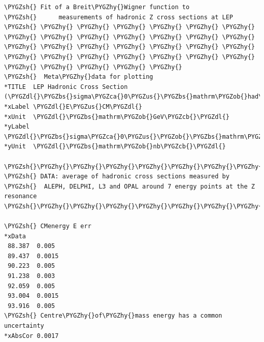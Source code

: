 \documentclass[a4paper,10pt,english]{sphinxmanual}
\def\PYGZbs{\char`\\}
\def\PYGZus{\char`\_}
\def\PYGZob{\char`\{}
\def\PYGZcb{\char`\}}
\def\PYGZca{\char`\^}
\def\PYGZsh{\char`\#}
\def\PYGZdl{\char`\$}
\def\PYGZhy{\char`\-}
\begin{document}
\begin{Verbatim}[commandchars=\\\{\}]
\PYGZsh{} Fit of a Breit\PYGZhy{}Wigner function to
\PYGZsh{}      measurements of hadronic Z cross sections at LEP
\PYGZsh{} \PYGZhy{} \PYGZhy{} \PYGZhy{} \PYGZhy{} \PYGZhy{} \PYGZhy{} \PYGZhy{} \PYGZhy{} \PYGZhy{} \PYGZhy{} \PYGZhy{} \PYGZhy{} \PYGZhy{} \PYGZhy{} \PYGZhy{} \PYGZhy{} \PYGZhy{} \PYGZhy{} \PYGZhy{} \PYGZhy{} \PYGZhy{} \PYGZhy{} \PYGZhy{} \PYGZhy{} \PYGZhy{} \PYGZhy{} \PYGZhy{} \PYGZhy{} \PYGZhy{} \PYGZhy{} \PYGZhy{} \PYGZhy{}
\PYGZsh{}  Meta\PYGZhy{}data for plotting
*TITLE  LEP Hadronic Cross Section (\PYGZdl{}\PYGZbs{}sigma\PYGZca{}0\PYGZus{}\PYGZbs{}mathrm\PYGZob{}had\PYGZcb{}\PYGZdl{})
*xLabel \PYGZdl{}E\PYGZus{}CM\PYGZdl{}
*xUnit  \PYGZdl{}\PYGZbs{}mathrm\PYGZob{}GeV\PYGZcb{}\PYGZdl{}
*yLabel \PYGZdl{}\PYGZbs{}sigma\PYGZca{}0\PYGZus{}\PYGZob{}\PYGZbs{}mathrm\PYGZob{}had\PYGZcb{}\PYGZcb{}\PYGZdl{}
*yUnit  \PYGZdl{}\PYGZbs{}mathrm\PYGZob{}nb\PYGZcb{}\PYGZdl{}

\PYGZsh{}\PYGZhy{}\PYGZhy{}\PYGZhy{}\PYGZhy{}\PYGZhy{}\PYGZhy{}\PYGZhy{}\PYGZhy{}\PYGZhy{}\PYGZhy{}\PYGZhy{}\PYGZhy{}\PYGZhy{}\PYGZhy{}\PYGZhy{}\PYGZhy{}\PYGZhy{}\PYGZhy{}\PYGZhy{}\PYGZhy{}\PYGZhy{}\PYGZhy{}\PYGZhy{}\PYGZhy{}\PYGZhy{}\PYGZhy{}\PYGZhy{}\PYGZhy{}\PYGZhy{}\PYGZhy{}\PYGZhy{}\PYGZhy{}\PYGZhy{}\PYGZhy{}\PYGZhy{}\PYGZhy{}\PYGZhy{}\PYGZhy{}\PYGZhy{}\PYGZhy{}\PYGZhy{}\PYGZhy{}\PYGZhy{}\PYGZhy{}\PYGZhy{}\PYGZhy{}\PYGZhy{}\PYGZhy{}\PYGZhy{}\PYGZhy{}\PYGZhy{}\PYGZhy{}\PYGZhy{}\PYGZhy{}\PYGZhy{}\PYGZhy{}\PYGZhy{}\PYGZhy{}\PYGZhy{}\PYGZhy{}\PYGZhy{}\PYGZhy{}\PYGZhy{}\PYGZhy{}\PYGZhy{}\PYGZhy{}\PYGZhy{}\PYGZhy{}\PYGZhy{}\PYGZhy{}
\PYGZsh{} DATA: average of hadronic cross sections measured by
\PYGZsh{}  ALEPH, DELPHI, L3 and OPAL around 7 energy points at the Z resonance
\PYGZsh{}\PYGZhy{}\PYGZhy{}\PYGZhy{}\PYGZhy{}\PYGZhy{}\PYGZhy{}\PYGZhy{}\PYGZhy{}\PYGZhy{}\PYGZhy{}\PYGZhy{}\PYGZhy{}\PYGZhy{}\PYGZhy{}\PYGZhy{}\PYGZhy{}\PYGZhy{}\PYGZhy{}\PYGZhy{}\PYGZhy{}\PYGZhy{}\PYGZhy{}\PYGZhy{}\PYGZhy{}\PYGZhy{}\PYGZhy{}\PYGZhy{}\PYGZhy{}\PYGZhy{}\PYGZhy{}\PYGZhy{}\PYGZhy{}\PYGZhy{}\PYGZhy{}\PYGZhy{}\PYGZhy{}\PYGZhy{}\PYGZhy{}\PYGZhy{}\PYGZhy{}\PYGZhy{}\PYGZhy{}\PYGZhy{}\PYGZhy{}\PYGZhy{}\PYGZhy{}\PYGZhy{}\PYGZhy{}\PYGZhy{}\PYGZhy{}\PYGZhy{}\PYGZhy{}\PYGZhy{}\PYGZhy{}\PYGZhy{}\PYGZhy{}\PYGZhy{}\PYGZhy{}\PYGZhy{}\PYGZhy{}\PYGZhy{}\PYGZhy{}\PYGZhy{}\PYGZhy{}\PYGZhy{}\PYGZhy{}\PYGZhy{}\PYGZhy{}\PYGZhy{}\PYGZhy{}

\PYGZsh{} CMenergy E err
*xData
 88.387  0.005
 89.437  0.0015
 90.223  0.005
 91.238  0.003
 92.059  0.005
 93.004  0.0015
 93.916  0.005
\PYGZsh{} Centre\PYGZhy{}of\PYGZhy{}mass energy has a common uncertainty
*xAbsCor 0.0017


\end{Verbatim}
\end{document}
